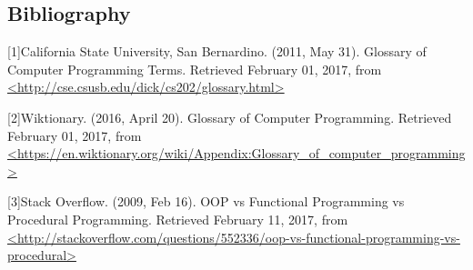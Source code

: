 \documentclass[12pt]{scrartcl} %
\begin{document}
    \subsection{Bibliography}

    [1]California State University, San Bernardino. (2011, May 31). Glossary of Computer Programming Terms. Retrieved February 01, 2017, from \url{<http://cse.csusb.edu/dick/cs202/glossary.html>}

    [2]Wiktionary. (2016, April 20). Glossary of Computer Programming. Retrieved February 01, 2017, from \url{<https://en.wiktionary.org/wiki/Appendix:Glossary_of_computer_programming>}

    [3]Stack Overflow.  (2009, Feb 16).  OOP vs Functional Programming vs Procedural Programming.  Retrieved February 11, 2017, from
    \url{<http://stackoverflow.com/questions/552336/oop-vs-functional-programming-vs-procedural>}
\end{document}
